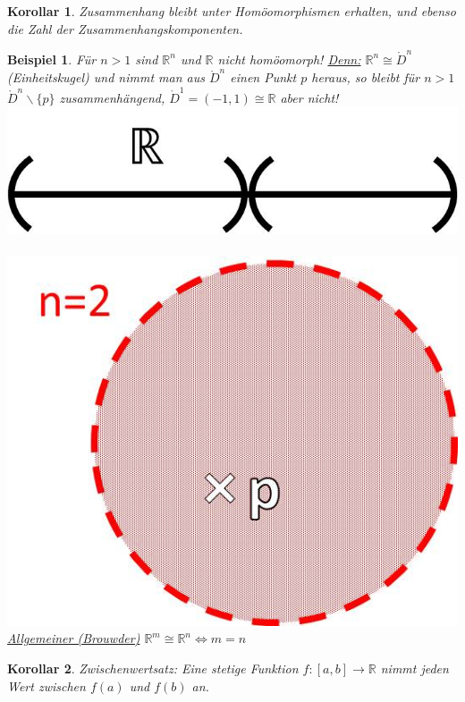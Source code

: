 \documentclass[a4paper,11pt,notitlepage]{report}
\newtheorem{corollary}{Korollar}[chapter]
\newtheorem{example}{Beispiel}[chapter]
\newcommand{\R}{{\ensuremath{\mathbb{R}}}}
\begin{document}
\begin{corollary}
	Zusammenhang bleibt unter Homöomorphismen erhalten, und ebenso die Zahl der Zusammenhangskomponenten.
\end{corollary}

\begin{example}
	Für $n > 1$ sind $\R^n$ und $\R$ nicht homöomorph!
	\newline
	\underline{Denn:} $\R^n \cong \mathring{D}^n$ (Einheitskugel) und nimmt man aus $\mathring{D}^n$ einen Punkt $p$ heraus, so bleibt für $n>1$ $\mathring{D}^n \backslash \{p\}$ zusammenhängend, $\mathring{D}^1 = (-1,1) \cong \R$ aber nicht!
	\newline
\includegraphics[scale=0.4]{images/R_ohne_p.jpg}$\qquad\qquad$
\includegraphics[scale=0.4]{images/R2_ohne_p.jpg}
	\newline
	\underline{Allgemeiner (Brouwder)} $\R^m \cong \R^n \Leftrightarrow m=n$
\end{example}

\begin{corollary}{Zwischenwertsatz:}
	Eine stetige Funktion $f \colon [a,b] \rightarrow \R$ nimmt jeden Wert zwischen $f(a)$ und $f(b)$ an.
\end{corollary}
\end{document}
